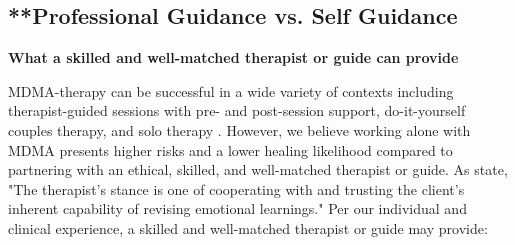 \documentclass[12pt,letterpaper]{book}
\begin{document}
\subsection{**Professional Guidance vs. Self Guidance}
\label{profressionalVSSelf}
\textbf{What a skilled and well-matched therapist or guide can provide}

MDMA-therapy can be successful in a wide variety of contexts including therapist-guided sessions with pre- and post-session support, do-it-yourself couples therapy, and solo therapy \cite{mitchellMDMAClinicalTrial2,colbertEvenings,hillsSolo}. However, we believe working alone with MDMA presents higher risks and a lower healing likelihood compared to partnering with an ethical, skilled, and well-matched therapist or guide. As \textcite{eckerUnlocking} state, "The therapist’s stance is one of cooperating with and trusting the client’s inherent capability of revising emotional learnings." Per our individual and clinical experience, a skilled and well-matched therapist or guide may provide:
\end{document}

